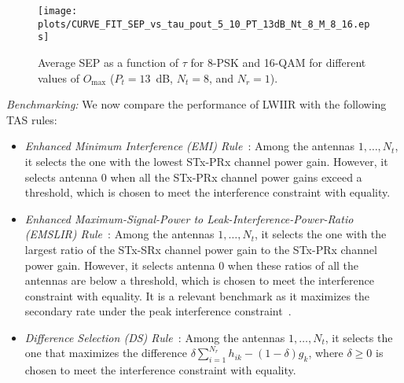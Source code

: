 \documentclass[12pt,draftcls,peerreview,onecolumn]{IEEEtran}
\newcommand{\lam}{\lambda}
\newcommand{\Nt}{{N_t}}
\newcommand{\Nr}{{N_r}}
\newcommand{\Pt}{{P_t}}
\newcommand{\such}{h}
\newcommand{\puch}{g}
\newcommand{\hk}[1]{{\such_{#1}}}
\newcommand{\gk}[1]{{\puch_{#1}}}
\newcommand{\outmax}{O_{\text{max}}}
\newcommand{\itau}{\tau}
\newcommand{\cone}{c_{1}}
\newcommand{\sumnr}{\sum_{i=1}^{\Nr}}
\begin{document}
\begin{figure}
	\centering \texttt{[image: plots/CURVE\_FIT\_SEP\_vs\_tau\_pout\_5\_10\_PT\_13dB\_Nt\_8\_M\_8\_16.eps]}
	\caption{Average SEP as a function of $\itau$ for 8-PSK and 16-QAM for different values of $\outmax$ ($\Pt = 13$~dB, $\Nt=8$, and $\Nr=1$).}
	\label{fig:SEP_vs_tau_QAM}
\end{figure}





{\em Benchmarking:} We now compare the performance of LWIIR with the following TAS rules:
\begin{itemize}
\item {\em Enhanced Minimum Interference (EMI) Rule~\cite{Sarvendranath_2013_TCOM}}: Among the antennas $1,\ldots,\Nt$, it selects the one with the lowest STx-PRx channel power gain. However, it selects antenna $0$ when all the STx-PRx channel power gains exceed a threshold, which is chosen to meet the interference constraint with equality. 

\item {\em Enhanced Maximum-Signal-Power to Leak-Interference-Power-Ratio (EMSLIR) Rule~\cite{Sarvendranath_2013_TCOM}}: Among the antennas $1,\ldots,\Nt$, it selects the one with the largest ratio of the STx-SRx channel power gain to the STx-PRx channel power gain. However, it selects antenna $0$ when these ratios of all the antennas are below a threshold, which is chosen to meet the interference constraint with equality. It is a relevant benchmark as it maximizes the secondary rate under the peak interference constraint~\cite{Wang_2010_TWC}. 

\item {\em Difference Selection (DS) Rule~\cite{Wang_2011_TCom,Sarvendranath_2014_TCOM}}: Among the antennas $1,\ldots,\Nt$, it selects the one that maximizes the difference $\delta \sumnr\hk{ik} -(1-\delta) \gk{k} $, where $\delta\geq 0$ is chosen to meet the interference constraint with equality.   

\end{itemize}
\end{document}

